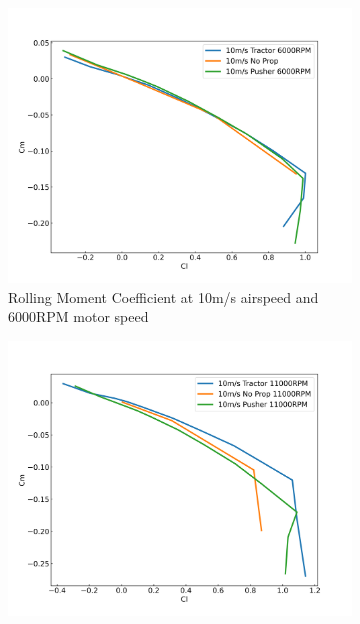 \begin{figure}[H]
    \centering
    \begin{subfigure}[b]{0.467\textwidth}
        \centering
        \includegraphics[width=\textwidth]{05_Results/Figs/ClCm/10ms_6000RPM_CmCl.png}
        \caption{Rolling Moment Coefficient at 10m/s airspeed and 6000RPM motor speed}
        \label{fig:CmCl_10ms_6000}
    \end{subfigure}
    \begin{subfigure}[b]{0.467\textwidth}
        \centering
        \includegraphics[width=\textwidth]{05_Results/Figs/ClCm/10ms_11000RPM_CmCl.png}

\end{subfigure}
\end{figure}

